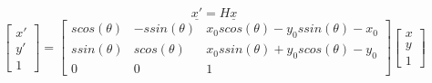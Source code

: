 \documentclass[a4paper]{article}
\begin{document}
\[ \underline{x'} = H\underline{x}\]
\[ \begin{bmatrix}x' \\ y' \\ 1\end{bmatrix} = 
\begin{bmatrix}
    s cos(\theta) & -s sin(\theta) & x_{0} s cos(\theta) - y_{0} s sin(\theta) - x_{0} \\
    s sin(\theta)& s cos(\theta) & x_{0} s sin(\theta) + y_{0} s cos(\theta) - y_{0} \\
    0 & 0 & 1
\end{bmatrix}
\begin{bmatrix}x \\ y \\ 1\end{bmatrix}
\]
\end{document}
